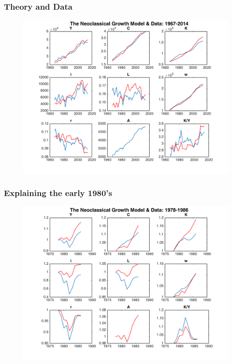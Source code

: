 \documentclass{beamer}
\begin{document}
\begin{frame}
\frametitle[alignment=center]{Theory and Data}
\begin{figure}
\centering
\includegraphics[scale=0.5]{Figure_7.png}
\end{figure}
\end{frame}

\begin{frame}
\frametitle[alignment=center]{Explaining the early 1980's}
\begin{figure}
\centering
\includegraphics[scale=0.5]{Figure_8.png}
\end{figure}
\end{frame}
\end{document}

